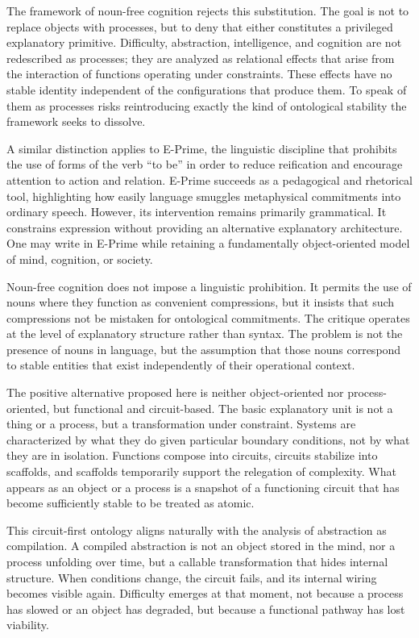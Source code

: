 \documentclass[12pt]{article}
\begin{document}
The framework of noun-free cognition rejects this substitution. The goal is not to replace objects with processes, but to deny that either constitutes a privileged explanatory primitive. Difficulty, abstraction, intelligence, and cognition are not redescribed as processes; they are analyzed as relational effects that arise from the interaction of functions operating under constraints. These effects have no stable identity independent of the configurations that produce them. To speak of them as processes risks reintroducing exactly the kind of ontological stability the framework seeks to dissolve.

A similar distinction applies to E-Prime, the linguistic discipline that prohibits the use of forms of the verb “to be” in order to reduce reification and encourage attention to action and relation. E-Prime succeeds as a pedagogical and rhetorical tool, highlighting how easily language smuggles metaphysical commitments into ordinary speech. However, its intervention remains primarily grammatical. It constrains expression without providing an alternative explanatory architecture. One may write in E-Prime while retaining a fundamentally object-oriented model of mind, cognition, or society.

Noun-free cognition does not impose a linguistic prohibition. It permits the use of nouns where they function as convenient compressions, but it insists that such compressions not be mistaken for ontological commitments. The critique operates at the level of explanatory structure rather than syntax. The problem is not the presence of nouns in language, but the assumption that those nouns correspond to stable entities that exist independently of their operational context.

The positive alternative proposed here is neither object-oriented nor process-oriented, but functional and circuit-based. The basic explanatory unit is not a thing or a process, but a transformation under constraint. Systems are characterized by what they do given particular boundary conditions, not by what they are in isolation. Functions compose into circuits, circuits stabilize into scaffolds, and scaffolds temporarily support the relegation of complexity. What appears as an object or a process is a snapshot of a functioning circuit that has become sufficiently stable to be treated as atomic.

This circuit-first ontology aligns naturally with the analysis of abstraction as compilation. A compiled abstraction is not an object stored in the mind, nor a process unfolding over time, but a callable transformation that hides internal structure. When conditions change, the circuit fails, and its internal wiring becomes visible again. Difficulty emerges at that moment, not because a process has slowed or an object has degraded, but because a functional pathway has lost viability.
\end{document}
